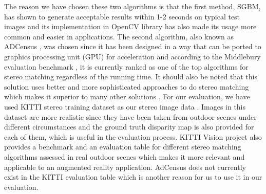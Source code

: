 The reason we have chosen these two algorithms is that the first method, SGBM, has shown to generate acceptable results within 1-2 seconds on typical test images \cite{hir08} and 
its implementation in OpenCV library has also made its usage more common and easier in applications. The second algorithm, also known as ADCensus \cite{mei11}, was chosen since 
it has been designed in a way that
can be ported to graphics processing unit (GPU) for acceleration and according to the Middlebury evaluation benchmark \cite{mideval}, it is currently ranked as one of the top algorithms for 
stereo matching regardless of the running time.
It should also be noted that this solution uses better and more sophisticated approaches to do stereo matching which makes it superior to many other solutions \cite{mideval}. \newline
For our evaluation, we have used KITTI stereo training dataset as our stereo image data \cite{kitti}. 
Images in this dataset are more realistic since they have been taken from outdoor scenes under different circumstances 
and the ground truth disparity map is also provided for each of them, which is useful in the evaluation process. KITTI Vision project also provides a benchmark and an evaluation table
for different stereo
matching algorithms assessed in real outdoor scenes which makes it more relevant and applicable to an augmented reality application. 
AdCensus does not currently exist in the KITTI evaluation table which is another reason for us to use it in our evaluation.
